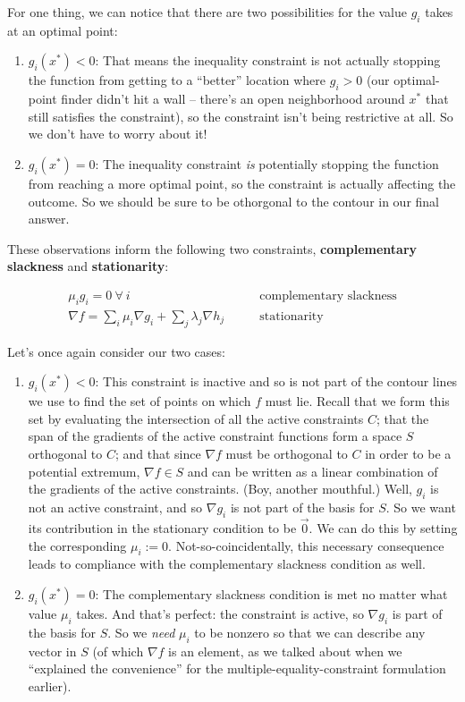 \documentclass[letterpaper,12pt]{report}
\providecommand{\tightlist}{%
  \setlength{\itemsep}{0pt}\setlength{\parskip}{0pt}}
\begin{document}
For one thing, we can notice that there are two possibilities for the
value \(g_i\) takes at an optimal point:

\begin{enumerate}
\def\labelenumi{\arabic{enumi}.}
\item
  \(g_i(x^*) < 0\): That means the inequality constraint is not actually
  stopping the function from getting to a ``better'' location where
  \(g_i > 0\) (our optimal-point finder didn't hit a wall -- there's an
  open neighborhood around \(x^*\) that still satisfies the constraint),
  so the constraint isn't being restrictive at all. So we don't have to
  worry about it!
\item
  \(g_i(x^*) = 0\): The inequality constraint \emph{is} potentially
  stopping the function from reaching a more optimal point, so the
  constraint is actually affecting the outcome. So we should be sure to
  be othorgonal to the contour in our final answer.
\end{enumerate}

These observations inform the following two constraints,
\textbf{complementary slackness} and \textbf{stationarity}:

\[\begin{split} \mu_i g_i = 0 \ \forall \ i \qquad & \text{complementary slackness} \\
\nabla f = \sum _i \mu _i \nabla g_i + \sum _j \lambda _j \nabla h_j \qquad & \text{stationarity} \end{split}\]

Let's once again consider our two cases:

\begin{enumerate}
\item
  \(g_i(x^*) < 0\): This constraint is inactive and so is not part of
  the contour lines we use to find the set of points on which \(f\) must
  lie. Recall that we form this set by evaluating the intersection of
  all the active constraints \(C\); that the span of the gradients of
  the active constraint functions form a space \(S\) orthogonal to
  \(C\); and that since \(\nabla f\) must be orthogonal to \(C\) in
  order to be a potential extremum, \(\nabla f \in S\) and can be
  written as a linear combination of the gradients of the active
  constraints. (Boy, another mouthful.) Well, \(g_i\) is not an active
  constraint, and so \(\nabla g_i\) is not part of the basis for \(S\).
  So we want its contribution in the stationary condition to be
  \(\vec{0}\). We can do this by setting the corresponding
  \(\mu_i := 0\). Not-so-coincidentally, this necessary consequence
  leads to compliance with the complementary slackness condition as
  well.
\item
  \(g_i(x^*) = 0\): The complementary slackness condition is met no
  matter what value \(\mu_i\) takes. And that's perfect: the constraint
  is active, so \(\nabla g_i\) is part of the basis for \(S\). So we
  \emph{need} \(\mu_i\) to be nonzero so that we can describe any vector
  in \(S\) (of which \(\nabla f\) is an element, as we talked about when
  we ``explained the convenience'' for the multiple-equality-constraint
  formulation earlier).
\end{enumerate}
\end{document}
